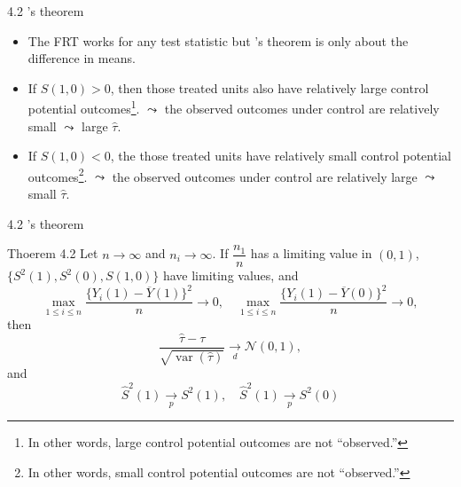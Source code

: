 \documentclass[aspectratio=169, 12pt]{beamer}
\begin{document}
\begin{frame}{4.2 \citet{neyman1923application}'s theorem}
  \begin{itemize}
    \item The FRT works for any test statistic but \citet{neyman1923application}'s theorem is only about the difference in means.
    \item If $S(1,0)>0$, then those treated units also have relatively large control potential outcomes\footnote{In other words, large control potential outcomes are not ``observed.''}. $\leadsto$ the observed outcomes under control are relatively small $\leadsto$ large $\widehat{\tau}$.
    \item If $S(1,0)<0$, the those treated units have relatively small control potential outcomes\footnote{In other words, small control potential outcomes are not ``observed.''}. $\leadsto$ the observed outcomes under control are relatively large $\leadsto$ small $\widehat{\tau}$.
  \end{itemize}
\end{frame}

\begin{frame}{4.2 \citet{neyman1923application}'s theorem}
  \begin{keybox}{Thoerem 4.2}
    Let $n\to \infty$ and $n_i\to \infty$. If $\dfrac{n_1}{n}$ has a limiting value in $(0,1)$, $\{S^2(1), S^2(0), S(1,0)\}$ have limiting values, and 
    \begin{equation}
      \max_{1\leq i\leq n}\frac{\{Y_i(1)-\overline{Y}(1)\}^2}{n}\to 0,\quad \max_{1\leq i\leq n}\frac{\{Y_i(1)-\overline{Y}(0)\}^2}{n}\to 0,
      \label{eq:thm4.2-1}
    \end{equation}
    then 
    \begin{equation}
      \frac{\widehat{\tau}-\tau}{\sqrt{\operatorname{var}(\widehat{\tau})}}\xrightarrow[d]{}\mathcal{N}(0,1),
      \label{eq:thm4.2-2}
    \end{equation}
    and
    \begin{equation}
      \widehat{S}^2(1)\xrightarrow[p]{}S^2(1), \quad \widehat{S}^2(1)\xrightarrow[p]{}S^2(0)
      \label{eq:thm4.2-3}
    \end{equation}
    \label{thm4.2}
  \end{keybox}
\end{frame}
\end{document}
